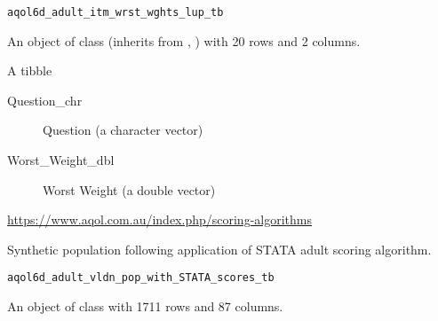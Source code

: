 \documentclass[a4paper]{book}
\begin{document}
%
\begin{Usage}
\begin{verbatim}
aqol6d_adult_itm_wrst_wghts_lup_tb
\end{verbatim}
\end{Usage}
%
\begin{Format}
An object of class  (inherits from , ) with 20 rows and 2 columns.
\end{Format}
%
\begin{Details}\relax
A tibble

\begin{description}

\item[Question\_chr] Question (a character vector)
\item[Worst\_Weight\_dbl] Worst Weight (a double vector)

\end{description}

\end{Details}
%
\begin{Source}\relax
\url{https://www.aqol.com.au/index.php/scoring-algorithms}
\end{Source}
%
\begin{Description}\relax
Synthetic population following application of STATA adult scoring algorithm.
\end{Description}
%
\begin{Usage}
\begin{verbatim}
aqol6d_adult_vldn_pop_with_STATA_scores_tb
\end{verbatim}
\end{Usage}
%
\begin{Format}
An object of class  with 1711 rows and 87 columns.
\end{Format}
%
\end{document}
